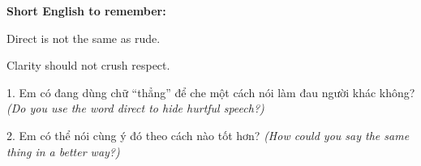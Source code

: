 \begin{ghinhoanh}
\textbf{Short English to remember:}

Direct is not the same as rude.

Clarity should not crush respect.
\end{ghinhoanh}

\begin{tuhocnhanh}
1. Em có đang dùng chữ ``thẳng'' để che một cách nói làm đau người khác không? \textit{(Do you use the word direct to hide hurtful speech?)}

2. Em có thể nói cùng ý đó theo cách nào tốt hơn? \textit{(How could you say the same thing in a better way?)}
\end{tuhocnhanh}
\ngancach
